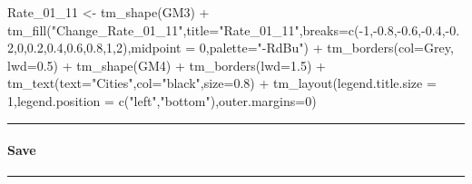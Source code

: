 \documentclass[
]{article}
\newenvironment{Shaded}{\begin{snugshade}}{\end{snugshade}}
\newcommand{\AttributeTok}[1]{\textcolor[rgb]{0.77,0.63,0.00}{#1}}
\newcommand{\DecValTok}[1]{\textcolor[rgb]{0.00,0.00,0.81}{#1}}
\newcommand{\FloatTok}[1]{\textcolor[rgb]{0.00,0.00,0.81}{#1}}
\newcommand{\FunctionTok}[1]{\textcolor[rgb]{0.00,0.00,0.00}{#1}}
\newcommand{\NormalTok}[1]{#1}
\newcommand{\OtherTok}[1]{\textcolor[rgb]{0.56,0.35,0.01}{#1}}
\newcommand{\SpecialCharTok}[1]{\textcolor[rgb]{0.00,0.00,0.00}{#1}}
\newcommand{\StringTok}[1]{\textcolor[rgb]{0.31,0.60,0.02}{#1}}
\begin{document}
\begin{Shaded}
\begin{Highlighting}[]
\NormalTok{Rate\_01\_11 }\OtherTok{\textless{}{-}} \FunctionTok{tm\_shape}\NormalTok{(GM3) }\SpecialCharTok{+}
  \FunctionTok{tm\_fill}\NormalTok{(}\StringTok{"Change\_Rate\_01\_11"}\NormalTok{,}\AttributeTok{title=}\StringTok{"Rate\_01\_11"}\NormalTok{,}\AttributeTok{breaks=}\FunctionTok{c}\NormalTok{(}\SpecialCharTok{{-}}\DecValTok{1}\NormalTok{,}\SpecialCharTok{{-}}\FloatTok{0.8}\NormalTok{,}\SpecialCharTok{{-}}\FloatTok{0.6}\NormalTok{,}\SpecialCharTok{{-}}\FloatTok{0.4}\NormalTok{,}\SpecialCharTok{{-}}\FloatTok{0.2}\NormalTok{,}\DecValTok{0}\NormalTok{,}\FloatTok{0.2}\NormalTok{,}\FloatTok{0.4}\NormalTok{,}\FloatTok{0.6}\NormalTok{,}\FloatTok{0.8}\NormalTok{,}\DecValTok{1}\NormalTok{,}\DecValTok{2}\NormalTok{),}\AttributeTok{midpoint =} \DecValTok{0}\NormalTok{,}\AttributeTok{palette=}\StringTok{"{-}RdBu"}\NormalTok{)  }\SpecialCharTok{+}
  \FunctionTok{tm\_borders}\NormalTok{(}\AttributeTok{col=}\StringTok{\textquotesingle{}Grey\textquotesingle{}}\NormalTok{, }\AttributeTok{lwd=}\FloatTok{0.5}\NormalTok{) }\SpecialCharTok{+}
\FunctionTok{tm\_shape}\NormalTok{(GM4) }\SpecialCharTok{+}
  \FunctionTok{tm\_borders}\NormalTok{(}\AttributeTok{lwd=}\FloatTok{1.5}\NormalTok{) }\SpecialCharTok{+}
  \FunctionTok{tm\_text}\NormalTok{(}\AttributeTok{text=}\StringTok{"Cities"}\NormalTok{,}\AttributeTok{col=}\StringTok{"black"}\NormalTok{,}\AttributeTok{size=}\FloatTok{0.8}\NormalTok{) }\SpecialCharTok{+}
\FunctionTok{tm\_layout}\NormalTok{(}\AttributeTok{legend.title.size =} \DecValTok{1}\NormalTok{,}\AttributeTok{legend.position =} \FunctionTok{c}\NormalTok{(}\StringTok{"left"}\NormalTok{,}\StringTok{"bottom"}\NormalTok{),}\AttributeTok{outer.margins=}\DecValTok{0}\NormalTok{)}
\end{Highlighting}
\end{Shaded}

\begin{center}\rule{0.5\linewidth}{0.5pt}\end{center}

\hypertarget{save}{%
\paragraph{Save}\label{save}}

\begin{center}\rule{0.5\linewidth}{0.5pt}\end{center}
\end{document}
